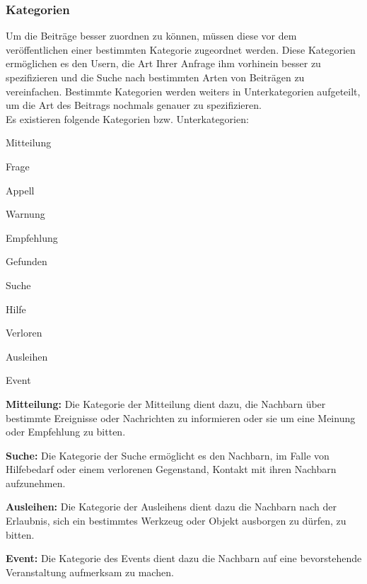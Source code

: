 \subsubsection{Kategorien}
Um die Beiträge besser zuordnen zu können, müssen diese vor dem veröffentlichen einer bestimmten Kategorie zugeordnet werden. Diese Kategorien ermöglichen es den Usern, die Art Ihrer Anfrage ihm vorhinein besser zu spezifizieren und die Suche nach bestimmten Arten von Beiträgen zu vereinfachen. Bestimmte Kategorien werden weiters in Unterkategorien aufgeteilt, um die Art des Beitrags nochmals genauer zu spezifizieren.
\\
Es existieren folgende Kategorien bzw. Unterkategorien:

\begin{compactitem}
  \item Mitteilung
  \begin{compactitem}
    \item Frage
    \item Appell
    \item Warnung
    \item Empfehlung
    \item Gefunden
  \end{compactitem}
  \item Suche
  \begin{compactitem}
    \item Hilfe
    \item Verloren
  \end{compactitem}
  \item Ausleihen
  \item Event
\end{compactitem}

\textbf{Mitteilung:} Die Kategorie der Mitteilung dient dazu, die Nachbarn über bestimmte Ereignisse oder Nachrichten zu informieren oder sie um eine Meinung oder Empfehlung zu bitten.

\textbf{Suche:} Die Kategorie der Suche ermöglicht es den Nachbarn, im Falle von Hilfebedarf oder einem verlorenen Gegenstand, Kontakt mit ihren Nachbarn aufzunehmen.

\textbf{Ausleihen:} Die Kategorie der Ausleihens dient dazu die Nachbarn nach der Erlaubnis, sich ein bestimmtes Werkzeug oder Objekt ausborgen zu dürfen, zu bitten.

\textbf{Event:} Die Kategorie des Events dient dazu die Nachbarn auf eine bevorstehende Veranstaltung aufmerksam zu machen.

